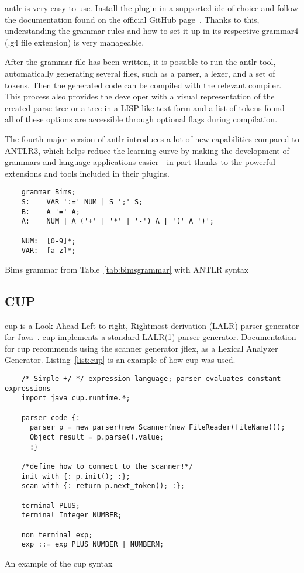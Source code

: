 \gls{antlr} is very easy to use. Install the plugin in a supported \gls{ide} of choice and follow the documentation found on the official GitHub page~\cite{ANTLR_Documentation}. Thanks to this, understanding the grammar rules and how to set it up in its respective grammar4 (.g4 file extension) is very manageable.

After the grammar file has been written, it is possible to run the \gls{antlr} tool, automatically generating several files, such as a parser, a lexer, and a set of tokens. Then the generated code can be compiled with the relevant compiler. This process also provides the developer with a visual representation of the created parse tree or a tree in a LISP-like text form and a list of tokens found - all of these options are accessible through optional flags during compilation.

The fourth major version of \gls{antlr} introduces a lot of new capabilities compared to ANTLR3, which helps reduce the learning curve by making the development of grammars and language applications easier - in part thanks to the powerful extensions and tools included in their plugins.


\begin{listing}[htb!]
  \begin{verbatim}
    grammar Bims;
    S:    VAR ':=' NUM | S ';' S;
    B:    A '=' A;
    A:    NUM | A ('+' | '*' | '-') A | '(' A ')';
    
    NUM:  [0-9]*;
    VAR:  [a-z]*;
  \end{verbatim}
  \caption{Bims grammar from Table~\ref{tab:bimsgrammar} with ANTLR syntax}
  \label{tab:antlrexample}
\end{listing}


\subsection{CUP}
\gls{cup} is a Look-Ahead Left-to-right, Rightmost derivation (LALR) parser generator for Java~\cite{cupParserGenerator}. \gls{cup} implements a standard LALR(1) parser generator. Documentation for \gls{cup} recommends using the scanner generator \gls{jflex}, as a Lexical Analyzer Generator. Listing~\ref{list:cup} is an example of how \gls{cup} was used.


\begin{listing}[htb!]
  \centering
  \begin{verbatim}
    /* Simple +/-*/ expression language; parser evaluates constant expressions
    import java_cup.runtime.*;

    parser code {:
      parser p = new parser(new Scanner(new FileReader(fileName)));
      Object result = p.parse().value;  
      :}

    /*define how to connect to the scanner!*/
    init with {: p.init(); :};
    scan with {: return p.next_token(); :};

    terminal PLUS;
    terminal Integer NUMBER;

    non terminal exp;
    exp ::= exp PLUS NUMBER | NUMBERM;
  \end{verbatim}
  \caption{An example of the \gls{cup} syntax}
  \label{list:cup}
\end{listing}


